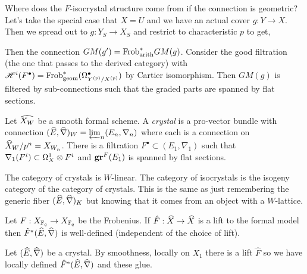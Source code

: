 \documentclass[12pt]{article}
\begin{document}
Where does the $F$-isocrystal structure come from if the connection is geometric? Let's take the special case that $X = U$ and we have an actual cover $g : Y \to X$. Then we spread out to $g : Y_S \to X_S$ and restrict to characteristic $p$ to get,
\begin{center}
\end{center}
Then the connection $GM(g') = \mathrm{Frob}_{\text{arith}}^* GM(g)$. Consider the good filtration (the one that passes to the derived category) with $\mathscr{H}^i(F^\bullet) = \mathrm{Frob}_{\text{geom}}^* (\Omega^\bullet_{Y^{(p)}/X^{(p)}})$ by Cartier isomorphism. Then $GM(g)$ is filtered by sub-connections such that the graded parts are spanned by flat sections.

\begin{defn}
Let $\widehat{X_W}$ be a smooth formal scheme. A \textit{crystal} is a pro-vector bundle with connection $(\widehat{E}, \widehat{\nabla})_W = \varprojlim_n (E_n, \nabla_n)$ where each is a connection on $\widehat{X}_W / p^n = X_{W_n}$. There is a filtration $F^\bullet \subset (E_1, \nabla_1)$ such that $\nabla_1(F^i) \subset \Omega_X^1 \otimes F^i$ and $\mathbf{gr}^F(E_1)$ is spanned by flat sections.
\end{defn}

\begin{defn}
The category of crystals is $W$-linear. The category of isocrystals is the isogeny category of the category of crystals. This is the same as just remembering the generic fiber $(\widehat{E}, \widehat{\nabla})_K$ but knowing that it comes from an object with a $W$-lattice. 
\end{defn}

\begin{rmk}
Let $F : X_{\mathbb{F}_q} \to X_{\mathbb{F}_q}$ be the Frobenius. If $\hat{F} : \widehat{X} \to \widehat{X}$ is a lift to the formal model then $\hat{F}^* (\widehat{E}, \widehat{\nabla})$ is well-defined (independent of the choice of lift). 
\end{rmk}

\begin{theorem}
Let $(\widehat{E}, \widehat{\nabla})$ be a crystal. By smoothness, locally on $X_1$ there is a lift $\hat{F}$ so we have locally defined $\hat{F}^* (\widehat{E}, \widehat{\nabla})$ and these glue.
\end{theorem}
\end{document}
